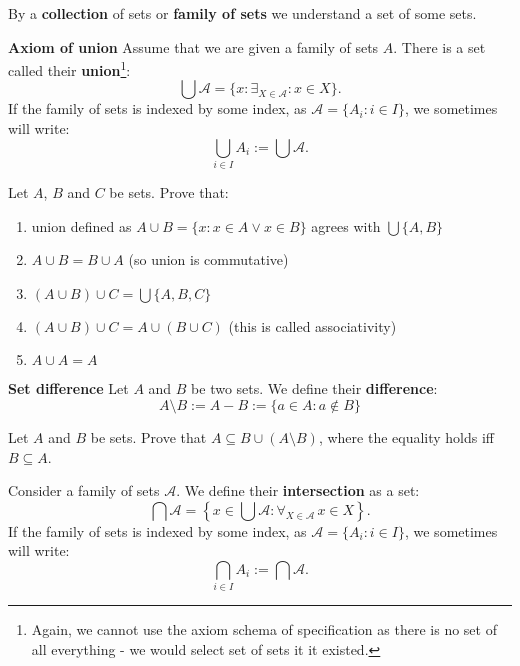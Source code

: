 \begin{definition}
  By a \textbf{collection} of sets or \textbf{family of sets} we understand a set of some sets.
\end{definition}

\begin{definition}
  \textbf{Axiom of union} Assume that we are given a family of sets $A$. There is a set called their \textbf{union}\footnote{Again, we cannot use the axiom schema of specification as there is no
  set of all everything - we would select set of sets it it existed.}:
  $$\bigcup \mathcal A = \{x : \exists_{X\in \mathcal A} : x\in X\}.$$
  If the family of sets is indexed by some index, as $\mathcal A = \{A_i : i\in I\}$, we sometimes will write:
  $$\bigcup_{i\in I} A_i := \bigcup \mathcal A.$$
\end{definition}

\begin{exercise}
  Let $A$, $B$ and $C$ be sets. Prove that:
  \begin{enumerate}
    \item union defined as $A\cup B=\{x : x\in A \vee x\in B\}$ agrees with $\bigcup \{A, B\}$
    \item $A\cup B = B\cup A$ (so union is commutative)
    \item $(A\cup B)\cup C = \bigcup \{A,B,C\}$
    \item $(A\cup B)\cup C = A\cup (B\cup C)$ (this is called associativity)
    \item $A\cup A=A$
  \end{enumerate}
\end{exercise}

\begin{definition}
  \textbf{Set difference} Let $A$ and $B$ be two sets. We define their \textbf{difference}:
  $$A\setminus B := A-B := \{a \in A : a\notin B\}$$
\end{definition}

\begin{exercise}
  Let $A$ and $B$ be sets. Prove that $A\subseteq B\cup (A\setminus B)$, where the equality holds iff $B\subseteq A$.
\end{exercise}

\begin{definition}
  Consider a family of sets $\mathcal A$. We define their \textbf{intersection} as a set:
  $$\bigcap \mathcal A = \left\{x\in \bigcup \mathcal A : \forall_{X\in\mathcal A}\, x\in X\right\}.$$
  If the family of sets is indexed by some index, as $\mathcal A = \{A_i : i\in I\}$, we sometimes will write:
  $$\bigcap_{i\in I} A_i := \bigcap \mathcal A.$$
\end{definition}

